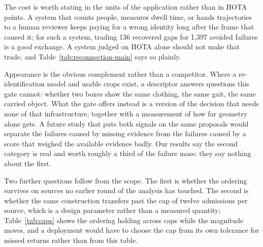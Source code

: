 The cost is worth stating in the units of the application rather than in
HOTA points. A system that counts people, measures dwell time, or hands
trajectories to a human reviewer keeps paying for a wrong identity long
after the frame that caused it; for such a system, trading 136 recovered
gaps for 1,397 avoided failures is a good exchange. A system judged on HOTA
alone should not make that trade, and Table~\ref{tab:reconnection-main}
says so plainly.

Appearance is the obvious complement rather than a competitor. Where a
re-identification model and usable crops exist, a descriptor answers
questions this gate cannot: whether two boxes show the same clothing, the
same gait, the same carried object. What the gate offers instead is a
version of the decision that needs none of that infrastructure, together
with a measurement of how far geometry alone gets. A future study that puts
both signals on the same proposals would separate the failures caused by
missing evidence from the failures caused by a score that weighed the
available evidence badly. Our results say the second category is real and
worth roughly a third of the failure mass; they say nothing about the first.

Two further questions follow from the scope. The first is whether the
ordering survives on sources no earlier round of the analysis has touched.
The second is whether the same construction transfers past the cap of
twelve admissions per source, which is a design parameter rather than a
measured quantity; Table~\ref{tab:caps} shows the ordering holding across
caps while the magnitude moves, and a deployment would have to choose the
cap from its own tolerance for missed returns rather than from this table.
